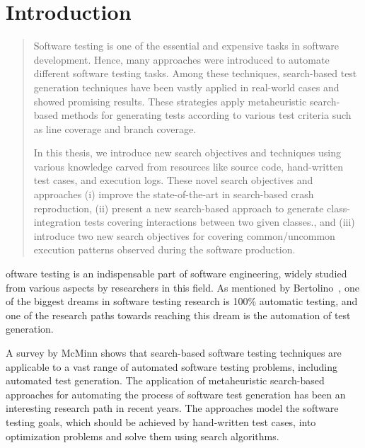 \chapter{Introduction}
\label{introduction}

\begin{abstract}
Software testing is one of the essential and expensive tasks in software development. Hence, many approaches were introduced to automate different software testing tasks. Among these techniques, search-based test generation techniques have been vastly applied in real-world cases and showed promising results. These strategies apply metaheuristic search-based methods for generating tests according to various test criteria such as line coverage and branch coverage.

In this thesis, we introduce new search objectives and techniques using various knowledge carved from resources like source code, hand-written test cases, and execution logs. These novel search objectives and approaches (i) improve the state-of-the-art in search-based crash reproduction, (ii) present a new search-based approach to generate class-integration tests covering interactions between two given classes., and (iii) introduce two new search objectives for covering common/uncommon execution patterns observed during the software production.
\end{abstract}



\newpage
{}oftware testing is an indispensable part of software engineering, widely studied from various aspects by researchers in this field. As mentioned by Bertolino~\cite{bertolino2007software}, one of the biggest dreams in software testing research is 100\% automatic testing, and one of the research paths towards reaching this dream is the automation of test generation.

A survey by McMinn \cite{McMinn2004} shows that search-based software testing techniques are applicable to a vast range of automated software testing problems, including automated test generation. The application of metaheuristic search-based approaches for automating the process of software test generation has been an interesting research path in recent years. The approaches model the software testing goals, which should be achieved by hand-written test cases, into optimization problems and solve them using search algorithms. 

